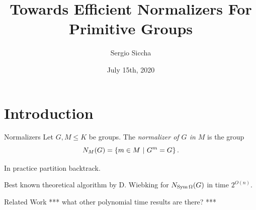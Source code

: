 \documentclass{beamer}
\title{Towards Efficient Normalizers For Primitive Groups}
\date{July 15th, 2020}
\author{Sergio Siccha}
\institute{TU Kaiserslautern}
\theoremstyle{plain}
\theoremstyle{definition}
\newcommand{\todo}[1]{{\color{red}*** #1 ***}}
\begin{document}
\maketitle
{}

\section{Introduction}
%

\begin{frame}{Normalizers}
Let $G, M \leq K$ be groups.
The \emph{normalizer of $G$ in $M$} is
the group
\[
N_M(G) =  \left\{  m \in M ~|~ G ^ m = G  \right\} .
\]

\pause
In practice partition backtrack.

Best known theoretical algorithm by D. Wiebking for
$N_{\operatorname{Sym} \Omega}(G)$ in
time $2 ^ {O(n)}$.
\end{frame}


\begin{frame}{Related Work}
\todo{what other polynomial time results are there?}
\end{frame}
\end{document}
